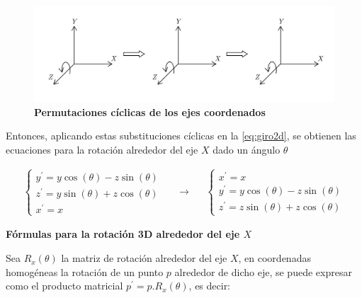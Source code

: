 \begin{figure}[h]
\includegraphics[width=12cm]{Img/GEO/geo-tras0.jpg}
\centering
    \caption{\footnotesize{\textbf{Permutaciones cíclicas de los ejes coordenados}}}
\end{figure}



Entonces, aplicando estas substituciones cíclicas en la \ref{eq:giro2d}, se obtienen las ecuaciones para la rotación alrededor del eje $X$ dado un ángulo
$\theta$


\begin{equation}\label{eq:giro2d1}
  \begin{split}
   \begin{cases}
{y}^{\prime} = y \cos(\theta) -z \sin(\theta) \\ 
{z}^{\prime} = y \sin(\theta) +z \cos(\theta) \\
{x}^{\prime} = x
\end{cases}
  \end{split}
\quad\longrightarrow\quad
  \begin{split}
   \begin{cases}
{x}^{\prime} = x \\ 
{y}^{\prime} = y \cos(\theta) -z \sin(\theta) \\
{z}^{\prime} = z \sin(\theta) +z \cos(\theta)
\end{cases}
\end{split}
\end{equation}

\begin{center}
\textbf{\footnotesize{Fórmulas para la rotación 3D alrededor del eje $X$}}
\end{center}
    
Sea $R_{x}( \theta )$ la matriz de rotación alrededor del eje $X$, en coordenadas homogéneas la
rotación de un punto $p$ alrededor de dicho eje, se puede expresar como el producto matricial $p^{\prime} = p.R_{x}(\theta)$, es decir:

